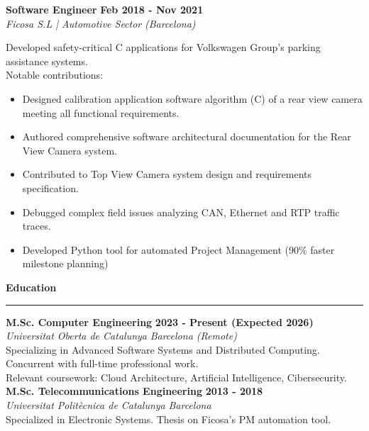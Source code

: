 \documentclass[11pt,a4paper]{article}
\newcommand{\cvsection}[1]{
    \vspace{0.5em}
    \noindent\textbf{\large #1}
    \vspace{0.5em}
    \hrule\vspace{0.5em}
}
\begin{document}
\begin{minipage}[t]{0.68\textwidth}
    \vspace{10pt}
    
    \noindent
    \textbf{Software Engineer} \hfill \textbf{Feb 2018 - Nov 2021} \\
    \textit{Ficosa S.L | Automotive Sector} \hfill \textit{(Barcelona)} \vspace{4pt}
    
    Developed safety-critical C applications for Volkswagen Group's parking assistance systems.\\ Notable contributions:
    \begin{itemize}[leftmargin=*,topsep=2pt,itemsep=-1pt]
        \item Designed calibration application software algorithm (C) of a rear view camera meeting all functional requirements.
        \item Authored comprehensive software architectural documentation for the Rear View Camera system.
        \item Contributed to Top View Camera system design and requirements specification.
        \item Debugged complex field issues analyzing CAN, Ethernet and RTP traffic traces.
        \item Developed Python tool for automated Project Management (90\% faster milestone planning)
    \end{itemize}
    
    \cvsection{Education}
    \noindent
    \textbf{M.Sc. Computer Engineering} \hfill \textbf{2023 - Present (Expected 2026)} \\
    \textit{Universitat Oberta de Catalunya} \hfill \textit{Barcelona (Remote)} \\
    Specializing in Advanced Software Systems and Distributed Computing.\\
    Concurrent with full-time professional work.\\
    Relevant coursework: Cloud Architecture, Artificial Intelligence, Cibersecurity.\\
    \noindent
    \textbf{M.Sc. Telecommunications Engineering} \hfill \textbf{2013 - 2018} \\
    \textit{Universitat Politècnica de Catalunya} \hfill \textit{Barcelona}\\
    Specialized in Electronic Systems. Thesis on Ficosa's PM automation tool.\\    
\end{minipage}
\hspace{0.02\textwidth} %
\end{document}
